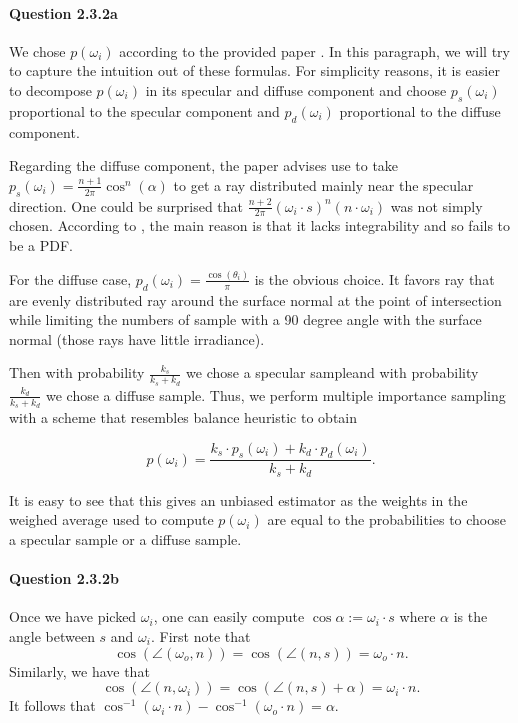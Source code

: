\documentclass{article}
\begin{document}
\paragraph{Question 2.3.2a}
We chose $p(\omega_i)$ according to the provided paper \cite{lawrence}. In this paragraph, we will try to capture the intuition out of these formulas. For simplicity reasons, it is easier to decompose $p(\omega_i)$ in its specular and diffuse component and choose $p_s(\omega_i)$ proportional to the specular component and $p_d(\omega_i)$ proportional to the diffuse component.

Regarding the diffuse component, the paper advises use to take $p_s(\omega_i) = \frac{n+1}{2\pi}\cos^n(\alpha)$ to get a ray distributed mainly near the specular direction.
One could be surprised that $\frac{n+2}{2\pi}(\omega_i \cdot s)^n(n \cdot \omega_i)$ was not simply chosen.
According to \cite{lafortune}, the main reason is that it lacks integrability and so fails to be a PDF.

For the diffuse case, $p_d(\omega_i) = \frac{\cos(\theta_i)}{\pi}$ is the obvious choice. It favors ray that are evenly distributed ray around the surface normal at the point of intersection while limiting the numbers of sample with a 90 degree angle with the surface normal (those rays have little irradiance). 

Then with probability $\frac{k_s}{k_s + k_d}$ we chose a specular sampleand with probability $\frac{k_d}{k_s + k_d}$ we chose a diffuse sample. Thus, we perform multiple importance sampling with a scheme that resembles balance heuristic to obtain

$$p(\omega_i) = \frac{k_s \cdot p_s(\omega_i) + k_d \cdot p_d(\omega_i)}{k_s + k_d}.$$

It is easy to see that this gives an unbiased estimator as the weights in the weighed average used to compute $p(\omega_i)$ are equal to the probabilities to choose a specular sample or a diffuse sample.

\paragraph{Question 2.3.2b}Once we have picked $\omega_i$, one can easily compute\linebreak 
$\cos\alpha := \omega_i \cdot s$ where $\alpha$ is the angle between $s$ and $\omega_i$. First note that $$\cos \left (\angle(\omega_o, n)\right ) = \cos \left ( \angle(n,s) \right ) = \omega_o\cdot n.$$ Similarly, we have that
$$\cos\left(\angle (n, \omega_i)\right) = \cos\left(\angle(n,s) + \alpha\right) = \omega_i \cdot n.$$
It follows that $\cos^{-1}{\left(\omega_i \cdot n\right)} - \cos^{-1}{\left(\omega_o\cdot n\right)} = \alpha.$
\end{document}
